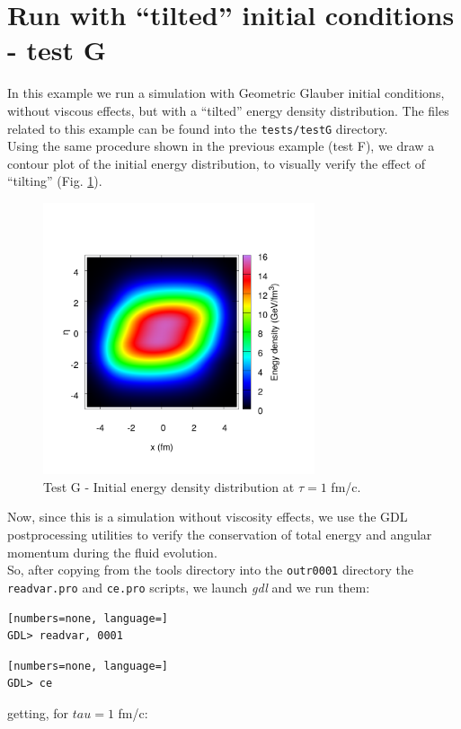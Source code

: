\section{Run with ``tilted'' initial conditions - test G}
In this example we run a simulation with Geometric Glauber initial conditions, without viscous effects, but with a ``tilted'' energy density distribution. The files related to this example can be found into the {\tt tests/testG} directory.\\
Using the same procedure shown in the previous example (test F), we draw a contour plot of the initial energy distribution, to visually verify the effect of ``tilting'' (Fig. \ref{fig:testG}).\\
\begin{figure}[!h]
 \begin{center}
  \includegraphics[width=8cm]{images/contour_energy_density_tau_1.png}
   \caption{Test G - Initial energy density distribution at $\tau=1$ fm/c.}
    \label{fig:testG}
 \end{center}
\end{figure}
Now, since this is a simulation without viscosity effects, we use the GDL postprocessing utilities to verify the conservation of total energy and angular momentum during the fluid evolution.\\
So, after copying from the tools directory into the {\tt outr0001} directory the {\tt readvar.pro} and {\tt ce.pro} scripts, we launch \emph{gdl} and we run them:
\begin{lstlisting}[numbers=none, language=]
GDL> readvar, 0001
\end{lstlisting}
\begin{lstlisting}[numbers=none, language=]
GDL> ce
\end{lstlisting}
getting, for $tau=1$ fm/c:
